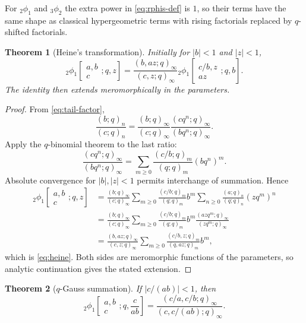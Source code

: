 \documentclass[11pt,oneside]{article}
\newtheorem{theorem}{Theorem}[section]
\theoremstyle{definition}
\begin{document}
For ${}_2\phi_1$ and ${}_3\phi_2$ the extra power in \eqref{eq:rphis-def} is $1$, so their terms have the same shape as classical hypergeometric terms with rising factorials replaced by $q$-shifted factorials.

\begin{theorem}[Heine's transformation]\label{thm:heine}
Initially for $|b|<1$ and $|z|<1$,
\begin{equation}\label{eq:heine}
 {}_2\phi_1\!\left[\begin{matrix}a,b\\c\end{matrix};q,z\right]
 =\frac{(b,az;q)_\infty}{(c,z;q)_\infty}
 {}_2\phi_1\!\left[\begin{matrix}c/b,z\\az\end{matrix};q,b\right].
\end{equation}
The identity then extends meromorphically in the parameters.
\end{theorem}

\begin{proof}
From \eqref{eq:tail-factor},
\[
 \frac{(b;q)_n}{(c;q)_n}
 =\frac{(b;q)_\infty}{(c;q)_\infty}
  \frac{(cq^n;q)_\infty}{(bq^n;q)_\infty}.
\]
Apply the $q$-binomial theorem to the last ratio:
\[
 \frac{(cq^n;q)_\infty}{(bq^n;q)_\infty}
 =\sum_{m\ge0}\frac{(c/b;q)_m}{(q;q)_m}(bq^n)^m.
\]
Absolute convergence for $|b|,|z|<1$ permits interchange of summation. Hence
\begin{align*}
 {}_2\phi_1\!\left[\begin{matrix}a,b\\c\end{matrix};q,z\right]
 &=\frac{(b;q)_\infty}{(c;q)_\infty}
 \sum_{m\ge0}\frac{(c/b;q)_m}{(q;q)_m}b^m
 \sum_{n\ge0}\frac{(a;q)_n}{(q;q)_n}(zq^m)^n\\
 &=\frac{(b;q)_\infty}{(c;q)_\infty}
 \sum_{m\ge0}\frac{(c/b;q)_m}{(q;q)_m}b^m
 \frac{(azq^m;q)_\infty}{(zq^m;q)_\infty}\\
 &=\frac{(b,az;q)_\infty}{(c,z;q)_\infty}
 \sum_{m\ge0}\frac{(c/b,z;q)_m}{(q,az;q)_m}b^m,
\end{align*}
which is \eqref{eq:heine}. Both sides are meromorphic functions of the parameters, so analytic continuation gives the stated extension.
\end{proof}

\begin{theorem}[$q$-Gauss summation]\label{thm:q-gauss}
If $|c/(ab)|<1$, then
\begin{equation}\label{eq:q-gauss}
 {}_2\phi_1\!\left[\begin{matrix}a,b\\c\end{matrix};q,\frac{c}{ab}\right]
 =\frac{(c/a,c/b;q)_\infty}{(c,c/(ab);q)_\infty}.
\end{equation}
\end{theorem}
\end{document}
